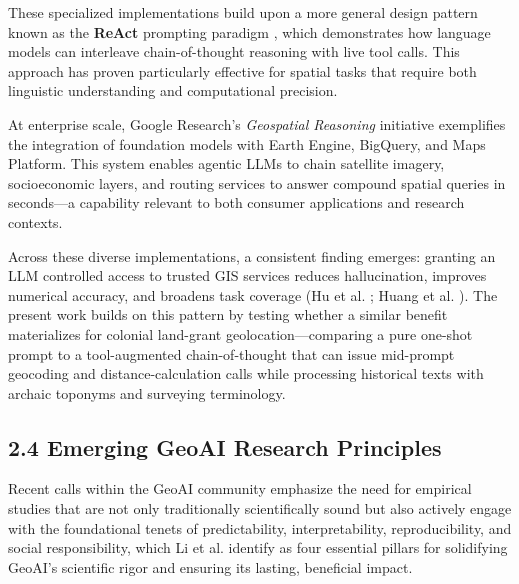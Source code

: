 These specialized implementations build upon a more general design
pattern known as the \textbf{ReAct} prompting paradigm
\citep{yao2023react}, which demonstrates how language models can
interleave chain-of-thought reasoning with live tool calls. This
approach has proven particularly effective for spatial tasks that
require both linguistic understanding and computational precision.

At enterprise scale, Google Research's \emph{Geospatial Reasoning}
initiative \citep{GoogleResearch2025_geospatial} exemplifies the
integration of foundation models with Earth Engine, BigQuery, and Maps
Platform. This system enables agentic LLMs to chain satellite imagery,
socioeconomic layers, and routing services to answer compound spatial
queries in seconds---a capability relevant to both consumer applications
and research contexts.

Across these diverse implementations, a consistent finding emerges:
granting an LLM controlled access to trusted GIS services reduces
hallucination, improves numerical accuracy, and broadens task coverage
(Hu et al. \citep{Hu2024_toponym_llm}; Huang et al.
\citep{Huang2024_geoagent}). The present work builds on this pattern by
testing whether a similar benefit materializes for colonial land-grant
geolocation---comparing a pure one-shot prompt to a tool-augmented
chain-of-thought that can issue mid-prompt geocoding and
distance-calculation calls while processing historical texts with
archaic toponyms and surveying terminology.

\subsection{2.4 Emerging GeoAI Research
Principles}\label{emerging-geoai-research-principles}

Recent calls within the GeoAI community emphasize the need for empirical
studies that are not only traditionally scientifically sound but also
actively engage with the foundational tenets of predictability,
interpretability, reproducibility, and social responsibility, which Li
et al. \citep{Li2024_geoai} identify as four essential pillars for
solidifying GeoAI's scientific rigor and ensuring its lasting,
beneficial impact.

